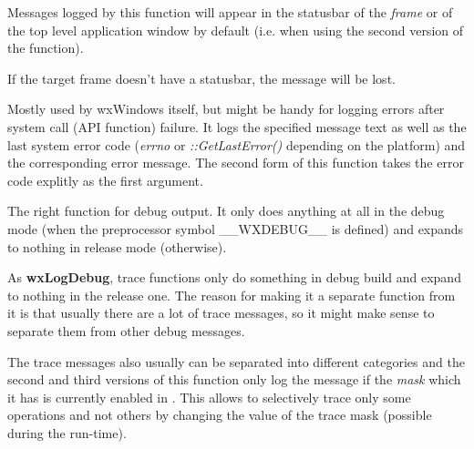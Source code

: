 Messages logged by this function will appear in the statusbar of the {\it
frame} or of the top level application window by default (i.e. when using
the second version of the function).

If the target frame doesn't have a statusbar, the message will be lost.

\label{wxlogsyserror}


Mostly used by wxWindows itself, but might be handy for logging errors after
system call (API function) failure. It logs the specified message text as well
as the last system error code ({\it errno} or {\it ::GetLastError()} depending
on the platform) and the corresponding error message. The second form
of this function takes the error code explitly as the first argument.

\label{wxlogdebug}


The right function for debug output. It only does anything at all in the debug
mode (when the preprocessor symbol \_\_WXDEBUG\_\_ is defined) and expands to
nothing in release mode (otherwise).

\label{wxlogtrace}




As {\bf wxLogDebug}, trace functions only do something in debug build and
expand to nothing in the release one. The reason for making
it a separate function from it is that usually there are a lot of trace
messages, so it might make sense to separate them from other debug messages.

The trace messages also usually can be separated into different categories and
the second and third versions of this function only log the message if the 
{\it mask} which it has is currently enabled in . This
allows to selectively trace only some operations and not others by changing
the value of the trace mask (possible during the run-time).

